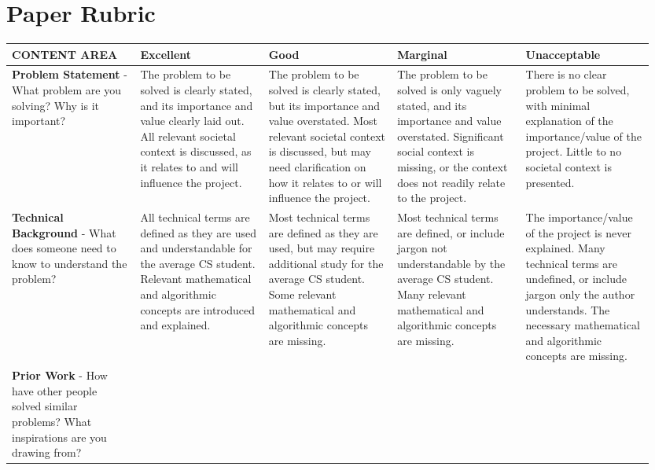 \documentclass[10pt,twocolumn]{article}
\begin{document}
\section{Paper Rubric}
\begin{landscape}\small
\begin{longtable}{p{0.19\linewidth} | p{0.19\linewidth} | p{0.19\linewidth} | p{0.19\linewidth} | p{0.19\linewidth}}
\textbf{CONTENT AREA}
    & \textbf{Excellent}
    & \textbf{Good}
    & \textbf{Marginal}
    & \textbf{Unacceptable} \\
\toprule \endhead
\textbf{Problem Statement} - What problem are you solving? Why is it important?
    & \cellcolor{excellent} The problem to be solved is clearly stated, and its importance and value clearly laid out. All relevant societal context is discussed, as it relates to and will influence the project.
    & \cellcolor{good} The problem to be solved is clearly stated, but its importance and value overstated. Most relevant societal context is discussed, but may need clarification on how it relates to or will influence the project.
    & \cellcolor{marginal} The problem to be solved is only vaguely stated, and its importance and value overstated. Significant social context is missing, or the context does not readily relate to the project.
    & \cellcolor{unacceptable} There is no clear problem to be solved, with minimal explanation of the importance/value of the project. Little to no societal context is presented. \\
\midrule
\textbf{Technical Background} - What does someone need to know to understand the problem?
    & \cellcolor{excellent} All technical terms are defined as they are used and understandable for the average CS student. Relevant mathematical and algorithmic concepts are introduced and explained.
    & \cellcolor{good} Most technical terms are defined as they are used, but may require additional study for the average CS student. Some relevant mathematical and algorithmic concepts are missing.
    & \cellcolor{marginal} Most technical terms are defined, or include jargon not understandable by the average CS student. Many relevant mathematical and algorithmic concepts are missing.
    & \cellcolor{unacceptable} The importance/value of the project is never explained. Many technical terms are undefined, or include jargon only the author understands. The necessary mathematical and algorithmic concepts are missing. \\
\midrule
\textbf{Prior Work} - How have other people solved similar problems? What inspirations are you drawing from?

\end{longtable}
\end{landscape}
\end{document}
